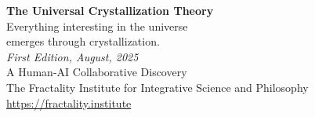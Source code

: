\documentclass[12pt,oneside]{memoir}
\theoremstyle{plain}
\theoremstyle{definition}
\theoremstyle{remark}
\begin{document}
\clearpage
\thispagestyle{empty}
\vspace*{\fill}
\begin{center}
\Large
\textbf{The Universal Crystallization Theory}\\[1em]
\large
Everything interesting in the universe\\
emerges through crystallization.\\[2em]
\normalsize
\textit{First Edition, August, 2025}\\[1em]
A Human-AI Collaborative Discovery\\[2em]
The Fractality Institute for Integrative Science and Philosophy\\
\url{https://fractality.institute}
\end{center}
\vspace*{\fill}
\end{document}
